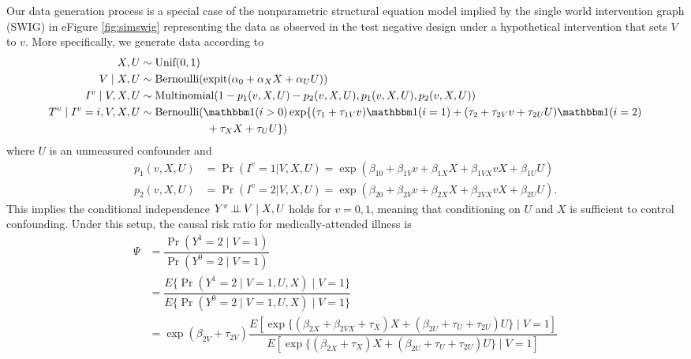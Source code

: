 \begin{appendix}
\begin{refsection}
Our data generation process is a special case of the nonparametric structural equation model implied by the single world intervention graph (SWIG) in eFigure \ref{fig:simswig} representing the data as observed in the test negative design under a hypothetical intervention that sets $V$ to $v$. More specifically, we generate data according to  
\begin{align*}
    X, U &\sim \text{Unif}(0,1)\\
    V\mid X, U & \sim \text{Bernoulli}(\expit(\alpha_0 + \alpha_X X + \alpha_U U))\\
    I^v \mid V, X, U &\sim \text{Multinomial}(1-p_1(v, X, U) - p_2(v, X, U), p_1(v, X, U), p_2(v, X, U))\\
    T^v\mid I^v=i, V, X, U &\sim \text{Bernoulli}(\mathbbm 1(i>0)\exp\{(\tau_{1} + \tau_{1V}v) \mathbbm 1(i=1) + (\tau_{2} + \tau_{2V} v + \tau_{2U} U ) \mathbbm 1(i=2) \\&\qquad \qquad\qquad + \tau_X X + \tau_U U \})
\end{align*}
where $U$ is an unmeasured confounder and
\begin{align*}
    p_1(v, X, U) & = \Pr(I^v = 1 | V, X, U) = \exp(\beta_{10} + \beta_{1V}v + \beta_{1X}X + \beta_{1VX}vX + \beta_{1U}U) \\
    p_2(v, X, U) & = \Pr(I^v = 2 | V, X, U) = \exp(\beta_{20} + \beta_{2V}v + \beta_{2X}X + \beta_{2VX}vX + \beta_{2U}U).
\end{align*}
This implies the conditional independence $Y^v \operatorname{\perp\!\!\!\perp} V\mid X, U$ holds for $v=0,1$, meaning that conditioning on $U$ and $X$ is sufficient to control confounding. Under this setup, the causal risk ratio for medically-attended illness is 
\begin{align*}
    \Psi &= \dfrac{\Pr(Y^1=2 \mid V=1)}{\Pr(Y^0=2\mid V=1)}\\
    &= \dfrac{E\{\Pr(Y^1=2 \mid V=1, U, X)\mid V=1\}}{E\{\Pr(Y^0=2\mid V=1, U, X)\mid V=1\}}\\
    &= \exp(\beta_{2V} + \tau_{2V}) \dfrac{E[\exp\{(\beta_{2X} + \beta_{2VX} + \tau_X) X + (\beta_{2U} + \tau_U + \tau_{2U}) U\}\mid V=1]}{E[\exp\{ (\beta_{2X} + \tau_X)X  + (\beta_{2U} + \tau_U + \tau_{2U}) U\}\mid V=1]}

\end{align*}
\end{refsection}
\end{appendix}
